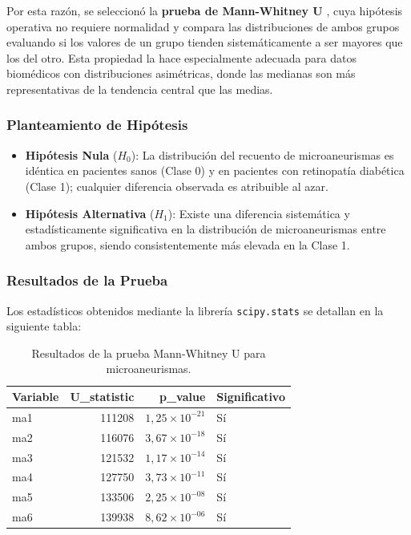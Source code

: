 Por esta razón, se seleccionó la \textbf{prueba de Mann-Whitney U} \parencite{mann1947test},
cuya hipótesis operativa no requiere normalidad y compara las distribuciones de ambos
grupos evaluando si los valores de un grupo tienden sistemáticamente a ser mayores
que los del otro. Esta propiedad la hace especialmente adecuada para datos biomédicos
con distribuciones asimétricas, donde las medianas son más representativas de la
tendencia central que las medias.

\subsubsection{Planteamiento de Hipótesis}

\begin{itemize}
    \item \textbf{Hipótesis Nula} ($H_{0}$): La distribución del recuento de microaneurismas
    es idéntica en pacientes sanos (Clase 0) y en pacientes con retinopatía diabética
    (Clase 1); cualquier diferencia observada es atribuible al azar.
    \item \textbf{Hipótesis Alternativa} ($H_{1}$): Existe una diferencia sistemática
    y estadísticamente significativa en la distribución de microaneurismas entre ambos
    grupos, siendo consistentemente más elevada en la Clase 1.
\end{itemize}

\subsubsection{Resultados de la Prueba}

Los estadísticos obtenidos mediante la librería \texttt{scipy.stats} \parencite{virtanen2020scipy}
se detallan en la siguiente tabla:

\begin{table}[htbp]
\centering
\caption{Resultados de la prueba Mann-Whitney U para microaneurismas.}
\begin{tabular}{lrrl}
\toprule
Variable & U\_statistic & p\_value & Significativo \\
\midrule
ma1 & 111208 & $1{,}25 \times 10^{-21}$ & Sí \\
ma2 & 116076 & $3{,}67 \times 10^{-18}$ & Sí \\
ma3 & 121532 & $1{,}17 \times 10^{-14}$ & Sí \\
ma4 & 127750 & $3{,}73 \times 10^{-11}$ & Sí \\
ma5 & 133506 & $2{,}25 \times 10^{-08}$ & Sí \\
ma6 & 139938 & $8{,}62 \times 10^{-06}$ & Sí \\
\bottomrule
\end{tabular}
\end{table}

